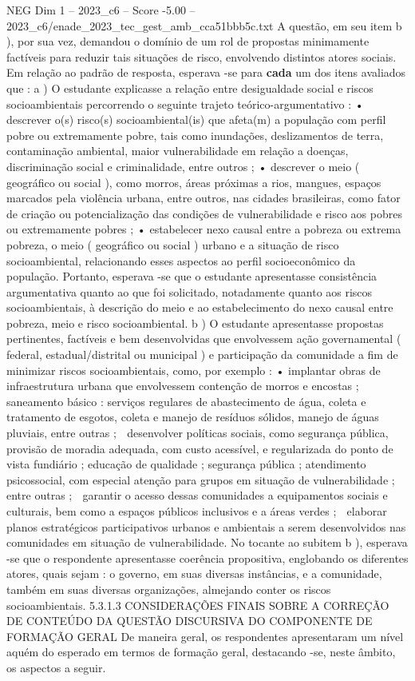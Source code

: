 \begin{textsample}{NEG Dim 1 – 2023\_c6 – Score -5.00 – 2023\_c6/enade\_2023\_tec\_gest\_amb\_cca51bbb5c.txt}
A questão, em seu item b ), por sua vez, demandou o domínio de um rol de propostas minimamente factíveis para reduzir tais situações de risco, envolvendo distintos atores sociais.
Em relação ao padrão de resposta, esperava -se para \textbf{cada} um dos itens avaliados que : a ) O estudante explicasse a relação entre desigualdade social e riscos socioambientais percorrendo o seguinte trajeto teórico-argumentativo : • descrever o(s) risco(s) socioambiental(is) que afeta(m) a população com perfil pobre ou extremamente pobre, tais como inundações, deslizamentos de terra, contaminação ambiental, maior vulnerabilidade em relação a doenças, discriminação social e criminalidade, entre outros ; • descrever o meio ( geográfico ou social ), como morros, áreas próximas a rios, mangues, espaços marcados pela violência urbana, entre outros, nas cidades brasileiras, como fator de criação ou potencialização das condições de vulnerabilidade e risco aos pobres ou extremamente pobres ; • estabelecer nexo causal entre a pobreza ou extrema pobreza, o meio ( geográfico ou social ) urbano e a situação de risco socioambiental, relacionando esses aspectos ao perfil socioeconômico da população.
Portanto, esperava -se que o estudante apresentasse consistência argumentativa quanto ao que foi solicitado, notadamente quanto aos riscos socioambientais, à descrição do meio e ao estabelecimento do nexo causal entre pobreza, meio e risco socioambiental. b ) O estudante apresentasse propostas pertinentes, factíveis e bem desenvolvidas que envolvessem ação governamental ( federal, estadual/distrital ou municipal ) e participação da comunidade a fim de minimizar riscos socioambientais, como, por exemplo : • implantar obras de infraestrutura urbana que envolvessem contenção de morros e encostas ; saneamento básico : serviços regulares de abastecimento de água, coleta e tratamento de esgotos, coleta e manejo de resíduos sólidos, manejo de águas pluviais, entre outras ;  desenvolver políticas sociais, como segurança pública, provisão de moradia adequada, com custo acessível, e regularizada do ponto de vista fundiário ; educação de qualidade ; segurança pública ; atendimento psicossocial, com especial atenção para grupos em situação de vulnerabilidade ; entre outras ;  garantir o acesso dessas comunidades a equipamentos sociais e culturais, bem como a espaços públicos inclusivos e a áreas verdes ;  elaborar planos estratégicos participativos urbanos e ambientais a serem desenvolvidos nas comunidades em situação de vulnerabilidade.
No tocante ao subitem b ), esperava -se que o respondente apresentasse coerência propositiva, englobando os diferentes atores, quais sejam : o governo, em suas diversas instâncias, e a comunidade, também em suas diversas organizações, almejando conter os riscos socioambientais. 5.3.1.3 CONSIDERAÇÕES FINAIS SOBRE A CORREÇÃO DE CONTEÚDO DA QUESTÃO DISCURSIVA DO COMPONENTE DE FORMAÇÃO GERAL De maneira geral, os respondentes apresentaram um nível aquém do esperado em termos de formação geral, destacando -se, neste âmbito, os aspectos a seguir.

\end{textsample}
